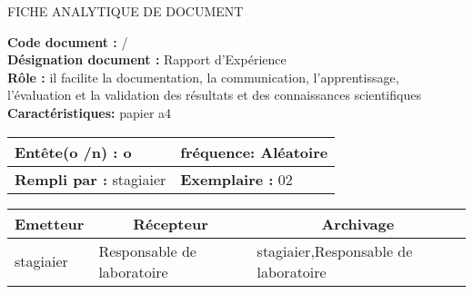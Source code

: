 

\newpage

\begin{center}
\Huge FICHE ANALYTIQUE DE DOCUMENT
\end{center}

\vspace{0.5cm}
    

\begin{flushleft}
\textbf{Code document :} / \\
\textbf{Désignation document :} Rapport d'Expérience \\
\textbf{Rôle :} il facilite la documentation, la communication, l'apprentissage, l'évaluation et la validation des résultats et des connaissances scientifiques \\
\textbf{Caractéristiques:} papier a4 \\
\end{flushleft}

\vspace{1cm}

\begin{table}[ht]
\begin{tabularx}{\textwidth}{|X|X|}

\hline
\textbf{Entête(o /n) :}  o   & \textbf{fréquence:} Aléatoire  \\
\hline
\textbf{Rempli par :}  stagiaier    & \textbf{Exemplaire :} 02  \\
\hline
\end{tabularx}
\end{table}

\vspace{1cm}

\begin{table}[ht]
\begin{tabularx}{\textwidth}{|X|X|X|}
  \hline
  \multicolumn{1}{|c|}{\centering\textbf{Emetteur}} & \multicolumn{1}{c|}{\centering\textbf{Récepteur}} & \multicolumn{1}{c|}{\centering\textbf{Archivage}} \\
  \hline
  stagiaier & Responsable de laboratoire & stagiaier,Responsable de laboratoire \\
  \hline
\end{tabularx}
\end{table}

\vspace{1cm}

